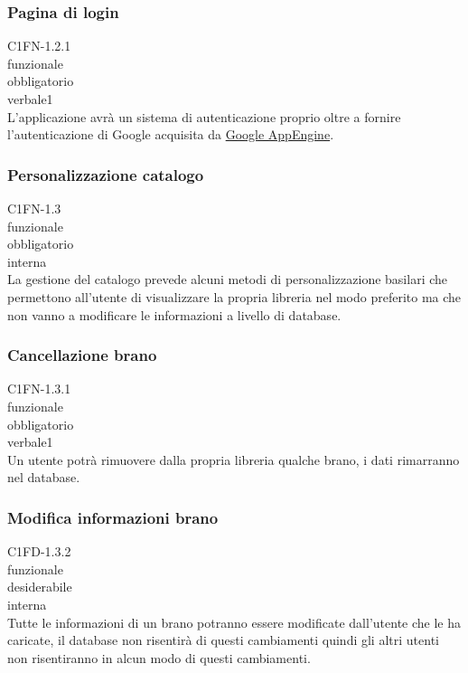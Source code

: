 \subsubsection*{Pagina di login}
 C1FN-1.2.1 \\
 funzionale \\
 obbligatorio \\
 verbale1 \\
L'applicazione avr\`a un sistema di autenticazione proprio oltre a fornire
l'autenticazione di Google acquisita da \underline{Google AppEngine}.

\subsubsection*{Personalizzazione catalogo}
 C1FN-1.3 \\
 funzionale \\
 obbligatorio \\
 interna \\
La gestione del catalogo prevede alcuni metodi di personalizzazione basilari che
permettono all'utente di visualizzare la propria libreria nel modo preferito ma
che non vanno a modificare le informazioni a livello di database.

\subsubsection*{Cancellazione brano}
 C1FN-1.3.1 \\
 funzionale \\
 obbligatorio \\
 verbale1 \\
Un utente potr\`a rimuovere dalla propria libreria qualche brano, i dati
rimarranno nel database.

\subsubsection*{Modifica informazioni brano}
 C1FD-1.3.2 \\
 funzionale \\
 desiderabile \\
 interna \\
Tutte le informazioni di un brano potranno essere modificate dall'utente che le
ha caricate, il database non risentir\`a di questi cambiamenti quindi gli altri
utenti non risentiranno in alcun modo di questi cambiamenti.

